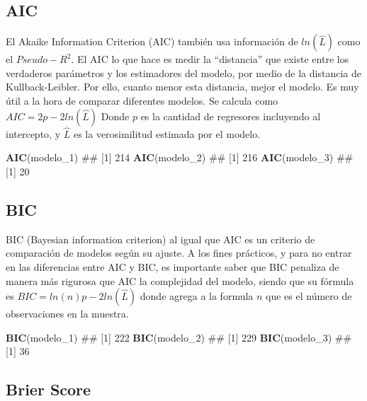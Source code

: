 \documentclass[]{book}
\newenvironment{Shaded}{\begin{snugshade}}{\end{snugshade}}
\newcommand{\KeywordTok}[1]{\textcolor[rgb]{0.13,0.29,0.53}{\textbf{#1}}}
\newcommand{\DecValTok}[1]{\textcolor[rgb]{0.00,0.00,0.81}{#1}}
\newcommand{\NormalTok}[1]{#1}
\begin{document}
\subsection{AIC}\label{aic}

El Akaike Information Criterion (AIC) también usa información de
\(ln(\hat {L})\) como el \(Pseudo-R^2\). El AIC lo que hace es medir la
``distancia'' que existe entre los verdaderos parámetros y los
estimadores del modelo, por medio de la distancia de Kullback-Leibler.
Por ello, cuanto menor esta distancia, mejor el modelo. Es muy útil a la
hora de comparar diferentes modelos. Se calcula como
\(AIC = 2p-2ln(\hat {L})\) Donde \(p\) es la cantidad de regresores
incluyendo al intercepto, y \(\hat{L}\) es la verosimilitud estimada por
el modelo.

\begin{Shaded}
\begin{Highlighting}[]
\KeywordTok{AIC}\NormalTok{(modelo_}\DecValTok{1}\NormalTok{)}
\NormalTok{## [1] 214}
\KeywordTok{AIC}\NormalTok{(modelo_}\DecValTok{2}\NormalTok{)}
\NormalTok{## [1] 216}
\KeywordTok{AIC}\NormalTok{(modelo_}\DecValTok{3}\NormalTok{)}
\NormalTok{## [1] 20}
\end{Highlighting}
\end{Shaded}

\subsection{BIC}\label{bic}

BIC (Bayesian information criterion) al igual que AIC es un criterio de
comparación de modelos según su ajuste. A los fines prácticos, y para no
entrar en las diferencias entre AIC y BIC, es importante saber que BIC
penaliza de manera más rigurosa que AIC la complejidad del modelo,
siendo que su fórmula es \(BIC=ln(n)p-2ln(\hat {L})\) donde agrega a la
formula \(n\) que es el número de observaciones en la muestra.

\begin{Shaded}
\begin{Highlighting}[]
\KeywordTok{BIC}\NormalTok{(modelo_}\DecValTok{1}\NormalTok{)}
\NormalTok{## [1] 222}
\KeywordTok{BIC}\NormalTok{(modelo_}\DecValTok{2}\NormalTok{)}
\NormalTok{## [1] 229}
\KeywordTok{BIC}\NormalTok{(modelo_}\DecValTok{3}\NormalTok{)}
\NormalTok{## [1] 36}
\end{Highlighting}
\end{Shaded}

\subsection{Brier Score}\label{brier-score}
\end{document}
